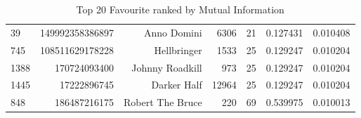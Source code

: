 \begin{table}
\begin{tabular}{| >{\small}l | >{\small}r | >{\small}r | >{\small}r | >{\small}r | >{\small}r |>{\small}r |}
39   &  149992358386897 &          Anno Domini &      6306 &       21 &             0.127431 &            0.010408 \\
745  &  108511629178228 &          Hellbringer &      1533 &       25 &             0.129247 &            0.010204 \\
1388 &     170724093400 &      Johnny Roadkill &       973 &       25 &             0.129247 &            0.010204 \\
1445 &      17222896745 &          Darker Half &     12964 &       25 &             0.129247 &            0.010204 \\
848  &     186487216175 &     Robert The Bruce &       220 &       69 &             0.539975 &            0.010013 \\
\hline
\end{tabular}
\caption{Top 20 Favourite ranked by Mutual Information}
\label {Top 20 Favourite ranked by Mutual Information}
\end{table}


\cleardoublepage


